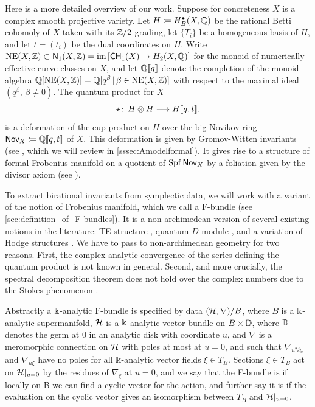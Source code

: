 \documentclass[twoside,leqno]{article}
\numberwithin{equation}{section}
\theoremstyle{plain}
\theoremstyle{definition}
\begin{document}
Here is a more detailed overview of our work. Suppose for concreteness $X$ is a complex smooth projective variety. 
Let $H\coloneqq H^{\bullet}_{B}(X,\mathbb Q )$  be the rational  Betti cohomoly of $X$ taken with its \linebreak $\mathbb Z/2$-grading, let 
$\{T_i\}$ be a homogeneous basis of $H$, and let $t=(t_i)$ be the dual coordinates on $H$.
Write $\operatorname{NE}(X,\mathbb Z) \subset \mathsf{N}_{1}(X,\mathbb Z) = \operatorname{im}\left[\mathsf{CH}_{1}(X) \to H_{2}(X,\mathbb Q)\right]$ for the monoid of numerically effective curve classes  on $X$, and let
$\mathbb Q [\![q]\!]$ denote the completion of the monoid algebra \linebreak $\mathbb Q [\operatorname{NE} (X,\mathbb Z )] = \mathbb Q [q^{\beta}\, \vert\, \beta\in \operatorname{NE} (X,\mathbb Z )]$ with respect to the maximal ideal $(q^{\beta} , \,\beta\neq 0)$.
The quantum product for $X$
\[
\star \colon \, H\otimes H \longrightarrow H[\![q,t]\!].
\]
is a deformation of the cup product on $H$ over the big Novikov ring $\mathsf{Nov}_{X} \coloneqq \mathbb Q[\![q,t]\!]$ of $X$. This deformation is  
given by Gromov-Witten invariants (see \cite{Kontsevich_Gromov-Witten_classes}, which we will review in \cref{sssec:Amodelformal}).
It gives rise to a structure of formal Frobenius manifold on a quotient of $\operatorname{Spf} \mathsf{Nov}_{X}$ by a foliation given by the divisor axiom (see \cite{Dubrovin_Geometry_of_2D,Manin_Frobenius_manifolds}).

\medskip

To extract  birational invariants from symplectic data, we will work with a variant of the notion of Frobenius manifold, which we call a F-bundle (see \cref{sec:definition_of_F-bundles}).
It is a non-archimedean version of several existing notions in the literature: TE-structure \cite{hertling_tt*_geometry,hertling-frobenius}, quantum $D$-module \cite{Iritani_Quantum_D-modules}, and a variation of \nc-Hodge structures \cite{Katzarkov_Hodge_theoretic_aspects}.
We have to pass to non-archimedean geometry for two reasons. First, the complex analytic convergence of the series defining the
quantum product is not known in general. 
Second, and more crucially, the spectral decomposition theorem does not hold over the complex numbers due to the Stokes phenomenon \cite{Katzarkov_Hodge_theoretic_aspects,HYZZ_Decomposition}.

Abstractly a $\Bbbk$-analytic  F-bundle is specified by data $(\mathcal H,\nabla)/B$, where $B$ is a $\Bbbk$-analytic supermanifold, $\mathcal H$ is a $\Bbbk$-analytic vector bundle on $B\times \mathbb D$, where $\mathbb D$ denotes the germ at $0$ in an analytic disk with coordinate $u$, and $\nabla$ is a meromorphic connection on $\mathcal H$ with  poles at most at $u =0$, and such that 
$\nabla_{u^{2}\partial_{u}}$ and $\nabla_{u\xi}$ have no poles for all $\Bbbk$-analytic vector 
fields $\xi \in T_{B}$. Sections $\xi \in T_{B}$ act on $\mathcal H|_{u=0}$ by the residues of $\nabla_{\xi}$ at $u=0$, and we say that the F-bundle is  if locally on B we can find a cyclic vector for the action, and further say it is   if the evaluation on the cyclic vector gives an isomorphism between $T_{B}$ and $\mathcal H|_{u=0}$. 
\end{document}
